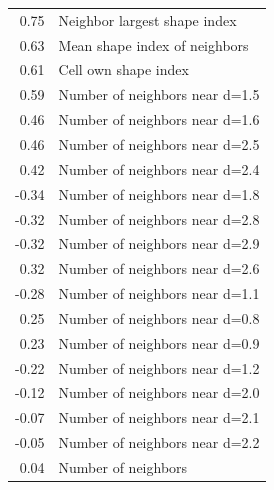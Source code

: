 \documentclass[twoside,twocolumn,9pt]{article}
\begin{document}
\begin{table}[h]
\begin{tabular*}{0.35\textwidth}{@{\extracolsep{\fill}}r|l}
0.75     & Neighbor largest shape index \\
0.63     & Mean shape index of neighbors \\
0.61     & Cell own shape index \\
0.59     & Number of neighbors near d=1.5 \\
0.46     & Number of neighbors near d=1.6 \\
0.46     & Number of neighbors near d=2.5 \\
0.42     & Number of neighbors near d=2.4\\
-0.34     & Number of neighbors near d=1.8\\
-0.32     & Number of neighbors near d=2.8\\
-0.32     & Number of neighbors near d=2.9\\
0.32     & Number of neighbors near d=2.6\\
-0.28     & Number of neighbors near d=1.1\\
0.25     & Number of neighbors near d=0.8\\
0.23     & Number of neighbors near d=0.9\\
-0.22     & Number of neighbors near d=1.2\\
-0.12     & Number of neighbors near d=2.0\\
-0.07     & Number of neighbors near d=2.1\\
-0.05     & Number of neighbors near d=2.2\\
0.04    & Number of neighbors \\
    \hline
  \end{tabular*}
\end{table}


  






\end{document}
